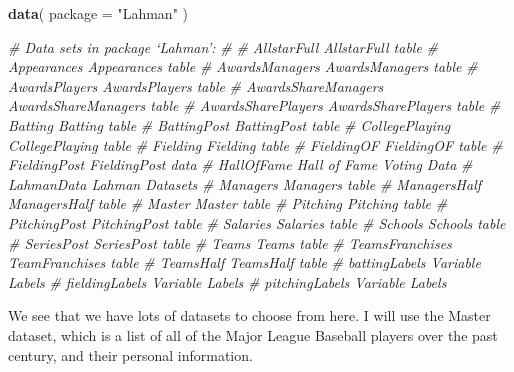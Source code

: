\documentclass[]{book}
\newenvironment{Shaded}{\begin{snugshade}}{\end{snugshade}}
\newcommand{\CommentTok}[1]{\textcolor[rgb]{0.56,0.35,0.01}{\textit{#1}}}
\newcommand{\DataTypeTok}[1]{\textcolor[rgb]{0.13,0.29,0.53}{#1}}
\newcommand{\KeywordTok}[1]{\textcolor[rgb]{0.13,0.29,0.53}{\textbf{#1}}}
\newcommand{\NormalTok}[1]{#1}
\newcommand{\StringTok}[1]{\textcolor[rgb]{0.31,0.60,0.02}{#1}}
\theoremstyle{definition}
\theoremstyle{definition}
\theoremstyle{definition}
\theoremstyle{remark}
\begin{document}
\begin{Shaded}
\begin{Highlighting}[]
\KeywordTok{data}\NormalTok{( }\DataTypeTok{package =} \StringTok{"Lahman"}\NormalTok{ )}

\CommentTok{# Data sets in package ‘Lahman’:}
\CommentTok{#}
\CommentTok{# AllstarFull                            AllstarFull table}
\CommentTok{# Appearances                            Appearances table}
\CommentTok{# AwardsManagers                         AwardsManagers table}
\CommentTok{# AwardsPlayers                          AwardsPlayers table}
\CommentTok{# AwardsShareManagers                    AwardsShareManagers table}
\CommentTok{# AwardsSharePlayers                     AwardsSharePlayers table}
\CommentTok{# Batting                                Batting table}
\CommentTok{# BattingPost                            BattingPost table}
\CommentTok{# CollegePlaying                         CollegePlaying table}
\CommentTok{# Fielding                               Fielding table}
\CommentTok{# FieldingOF                             FieldingOF table}
\CommentTok{# FieldingPost                           FieldingPost data}
\CommentTok{# HallOfFame                             Hall of Fame Voting Data}
\CommentTok{# LahmanData                             Lahman Datasets}
\CommentTok{# Managers                               Managers table}
\CommentTok{# ManagersHalf                           ManagersHalf table}
\CommentTok{# Master                                 Master table}
\CommentTok{# Pitching                               Pitching table}
\CommentTok{# PitchingPost                           PitchingPost table}
\CommentTok{# Salaries                               Salaries table}
\CommentTok{# Schools                                Schools table}
\CommentTok{# SeriesPost                             SeriesPost table}
\CommentTok{# Teams                                  Teams table}
\CommentTok{# TeamsFranchises                        TeamFranchises table}
\CommentTok{# TeamsHalf                              TeamsHalf table}
\CommentTok{# battingLabels                          Variable Labels}
\CommentTok{# fieldingLabels                         Variable Labels}
\CommentTok{# pitchingLabels                         Variable Labels}
\end{Highlighting}
\end{Shaded}

We see that we have lots of datasets to choose from here. I will use the
Master dataset, which is a list of all of the Major League Baseball
players over the past century, and their personal information.
\end{document}
